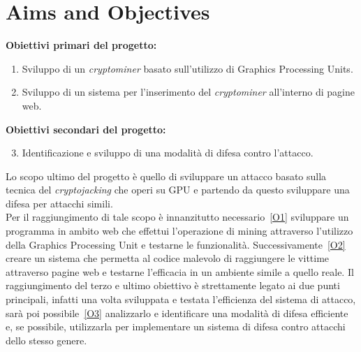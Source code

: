 \documentclass[
11pt, %
oneside, %
italian, %
onehalfspacing,%
headsepline, %
]{MastersDoctoralThesis} %
\begin{document}
{\chapter{Aims and Objectives}}
\textbf{Obiettivi primari del progetto:}
\begin{enumerate}[label= (\roman*)]
        \item\label{O1} Sviluppo di un \emph{cryptominer} basato sull'utilizzo di Graphics Processing Units.
        \item\label{O2} Sviluppo di un sistema per l'inserimento del \emph{cryptominer} all'interno di pagine web.
\end{enumerate}
\textbf{Obiettivi secondari del progetto:}
\begin{enumerate}[label= (\roman*)]
        \setcounter{enumi}{2}
        \item\label{O3} Identificazione e sviluppo di una modalità di difesa contro l'attacco.
\end{enumerate}
Lo scopo ultimo del progetto è quello di sviluppare un attacco basato sulla tecnica del \emph{cryptojacking} che operi su GPU e partendo da questo sviluppare una difesa per attacchi simili.\\
Per il raggiungimento di tale scopo è innanzitutto necessario~\ref{O1} sviluppare un programma in ambito web che effettui l'operazione di mining attraverso l'utilizzo della Graphics Processing Unit e testarne le funzionalità. Successivamente~\ref{O2} creare un sistema che permetta al codice malevolo di raggiungere le vittime attraverso pagine web e testarne l'efficacia in un ambiente simile a quello reale. Il raggiungimento del terzo e ultimo obiettivo è strettamente legato ai due punti principali, infatti una volta sviluppata e testata l'efficienza del sistema di attacco, sarà poi possibile~\ref{O3} analizzarlo e identificare una modalità di difesa efficiente e, se possibile, utilizzarla per implementare un sistema di difesa contro attacchi dello stesso genere.
\end{document}

